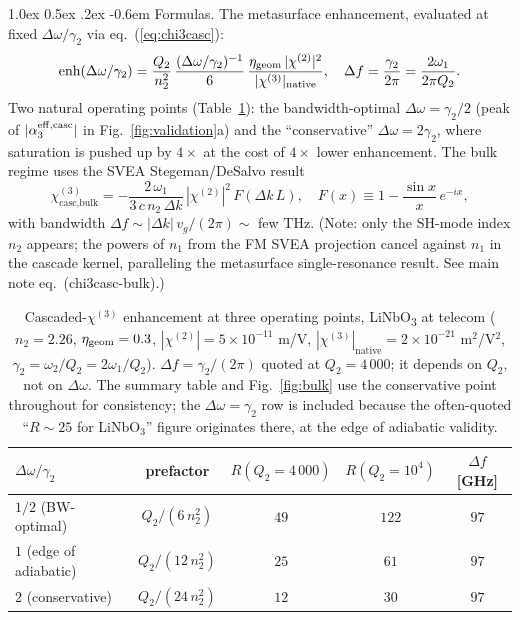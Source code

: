 \documentclass[11pt,a4paper]{article}
\makeatletter
\newcommand{\chitwo}{\chi^{(2)}}
\newcommand{\chithree}{\chi^{(3)}}
\newcommand{\Dom}{\Delta\omega}
\newcommand{\effc}{{\rm eff,casc}}
\newcommand{\geom}{{\rm geom}}
\renewcommand\paragraph{%
  \@startsection{paragraph}{4}{\z@}%
                {1.0ex \@plus 0.5ex \@minus .2ex}%
                {-0.6em}%
                {\normalfont\itshape}}
\makeatother
\begin{document}
\paragraph{Formulas.}
The metasurface enhancement, evaluated at fixed
$\Dom/\gamma_2$ via eq.~(\ref{eq:chi3casc}):
\begin{equation}
  \text{enh}(\Dom/\gamma_2)
   = \frac{Q_2}{n_2^{2}}\,
     \frac{(\Dom/\gamma_2)^{-1}}{6}\,
     \frac{\eta_\geom\, |\chitwo|^{2}}{|\chithree|_{\rm native}},
   \quad
   \Delta f = \frac{\gamma_2}{2\pi} = \frac{2\omega_1}{2\pi Q_2}.
\end{equation}
Two natural operating points (Table~\ref{tab:opppoint}): the
bandwidth-optimal $\Dom = \gamma_2/2$ (peak of
$|\alpha_3^{\effc}|$ in Fig.~\ref{fig:validation}a) and the
``conservative'' $\Dom = 2\gamma_2$, where saturation is pushed up by
$4\times$ at the cost of $4\times$ lower enhancement.
The bulk regime uses the SVEA Stegeman/DeSalvo result
\begin{equation}
  \chithree_{\text{casc,bulk}}
   = -\frac{2\,\omega_1}{3\,c\,n_2\,\Delta k}\,
       |\chitwo|^{2}\, F(\Delta k\,L),
   \quad
   F(x) \equiv 1 - \frac{\sin x}{x}\,e^{-ix},
\end{equation}
with bandwidth $\Delta f \sim |\Delta k|\, v_g / (2\pi) \sim$ few THz.
(Note: only the SH-mode index $n_2$ appears; the powers of $n_1$ from the
FM SVEA projection cancel against $n_1$ in the cascade kernel, paralleling
the metasurface single-resonance result.  See main note eq.~(chi3casc-bulk).)

\begin{table}[H]
\centering
\renewcommand{\arraystretch}{1.20}
\small
\begin{tabular}{lcccc}
\toprule
$\Dom/\gamma_2$ & prefactor & $R(Q_2{=}4\,000)$ & $R(Q_2{=}10^{4})$ & $\Delta f$ [GHz] \\
\midrule
$1/2$ (BW-optimal)      & $Q_2/(6\, n_2^{2})$  & $49$ & $122$ & $97$ \\
$1$ (edge of adiabatic) & $Q_2/(12\, n_2^{2})$ & $25$ & $61$  & $97$ \\
$2$ (conservative)      & $Q_2/(24\, n_2^{2})$ & $12$ & $30$  & $97$ \\
\bottomrule
\end{tabular}
\caption{Cascaded-$\chithree$ enhancement at three operating points,
LiNbO\textsubscript{3} at telecom ($n_2 = 2.26$, $\eta_\geom = 0.3$,
$|\chitwo| = 5\!\times\!10^{-11}$ m/V,
$|\chithree|_\text{native} = 2\!\times\!10^{-21}$ m$^{2}$/V$^{2}$,
$\gamma_2 = \omega_2/Q_2 = 2\omega_1/Q_2$).  $\Delta f = \gamma_2/(2\pi)$
quoted at $Q_2 = 4\,000$; it depends on $Q_2$, not on $\Dom$. The
summary table and Fig.~\ref{fig:bulk} use the conservative point
throughout for consistency; the $\Dom=\gamma_2$ row is included
because the often-quoted ``$R\!\sim\!25$ for LiNbO$_3$'' figure
originates there, at the edge of adiabatic validity.}
\label{tab:opppoint}
\end{table}
\end{document}
